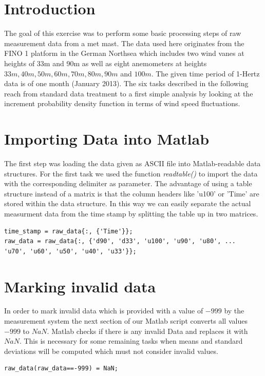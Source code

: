 \documentclass[10pt]{article}
\begin{document}
\lstset{
	language=Matlab,
	basicstyle=\footnotesize,
	frame=tb,
	xleftmargin=.2\textwidth,
	xrightmargin=.2\textwidth
}
\onehalfspacing

\tableofcontents
\newpage
\section*{Introduction}
The goal of this exercise was to perform some basic processing steps of raw measurement data from a met mast. The data used here originates from the FINO 1 platform in the German Northsea which includes two wind vanes at heights of 33m and 90m as well as eight anemometers at heights $33m, 40m, 50m, 60m, 70m, 80m, 90m$ and $100m$. The given time period of 1-Hertz data is of one month (January 2013). The six tasks described in the following reach from standard data treatment to a first simple analysis by looking at the increment probability density function in terms of wind speed fluctuations.

\section{Importing Data into Matlab}
The first step was loading the data given as ASCII file into Matlab-readable data structures. For the first task we used the function \textit{readtable()} to import the data with the corresponding delimiter as parameter. The advantage of using a table structure instead of a matrix is that the column headers like 'u100' or 'Time' are stored within the data structure. In this way we can easily separate the actual measurment data from the time stamp by splitting the table up in two matrices. \\
\begin{lstlisting}
time_stamp = raw_data{:, {'Time'}};
raw_data = raw_data{:, {'d90', 'd33', 'u100', 'u90', 'u80', ...
'u70', 'u60', 'u50', 'u40', 'u33'}};
\end{lstlisting}

\section{Marking invalid data}
In order to mark invalid data which is provided with a value of $-999$ by the measurement system the next section of our Matlab script converts all values $-999$ to $NaN$. Matlab checks if there is any invalid Data and replaces it with $NaN$. This is necessary for some remaining tasks when means and standard deviations will be computed which must not consider invalid values.\\
\begin{lstlisting}
raw_data(raw_data==-999) = NaN;
\end{lstlisting}
\end{document}
